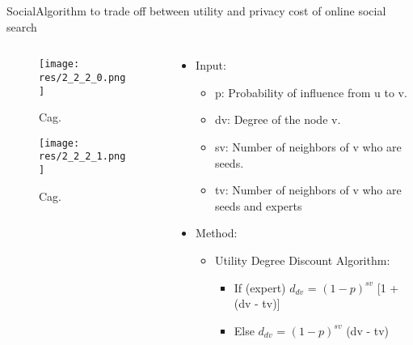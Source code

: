 \begin{frame}{Social}{Algorithm to trade off between utility and privacy cost of online social search \cite{li_algorithm_2016}}

	\begin{columns}
		\begin{column}{0.34\textwidth}
			\begin{center}
			
				\begin{figure}
					\texttt{[image: res/2\_2\_2\_0.png]}
					\caption{\label{fig:2_2_2_0}Cag.}
				\end{figure}
				
				\begin{figure}
					\texttt{[image: res/2\_2\_2\_1.png]}
					\caption{\label{fig:2_2_2_1}Cag.}
				\end{figure}
				
			\end{center}
		\end{column}
		
		\begin{column}{0.66\textwidth}
		
			\begin{itemize}
				\item Input:
					\begin{itemize}
						\item p:  Probability of influence from u to v.
						\item dv:  Degree of the node v.
						\item sv:  Number of neighbors of v who are seeds.
						\item tv: Number of neighbors of v who are seeds and experts
					\end{itemize}

				\item Method:
					\begin{itemize}
						\item Utility Degree Discount Algorithm:
							\begin{itemize}
								\item If (expert) \hspace{3mm} $d_{dv}$ = $(1 - p)^{sv}$ [1 + (dv - tv)]
								\item Else \hspace{9mm} $d_{dv}$ = $(1 - p)^{sv}$ \hspace{4mm} (dv - tv)
							\end{itemize}
							

\end{itemize}
\end{itemize}
\end{column}
\end{columns}
\end{frame}
